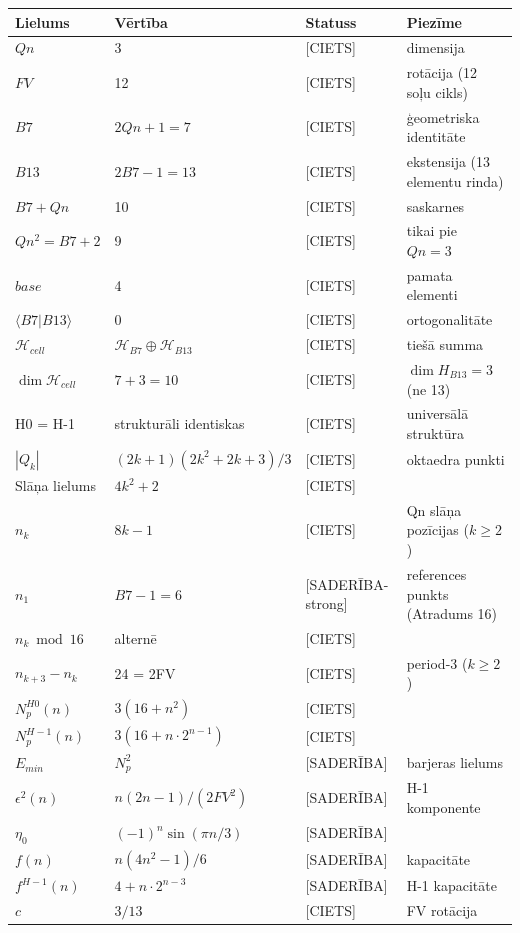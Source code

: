 \documentclass[12pt,a4paper]{article}
\begin{document}
\begin{longtable}{|l|l|l|l|}
\hline
\textbf{Lielums} & \textbf{Vērtība} & \textbf{Statuss} & \textbf{Piezīme} \\
\hline
\endhead
$Qn$ & 3 & [CIETS] & dimensija \\
$FV$ & 12 & [CIETS] & rotācija (12 soļu cikls) \\
$B7$ & $2Qn+1 = 7$ & [CIETS] & ģeometriska identitāte \\
$B13$ & $2B7-1 = 13$ & [CIETS] & ekstensija (13 elementu rinda) \\
$B7+Qn$ & 10 & [CIETS] & saskarnes \\
$Qn^2 = B7+2$ & 9 & [CIETS] & tikai pie $Qn=3$ \\
$base$ & 4 & [CIETS] & pamata elementi \\
$\langle B7|B13\rangle$ & 0 & [CIETS] & ortogonalitāte \\
$\mathcal{H}_{cell}$ & $\mathcal{H}_{B7}\oplus\mathcal{H}_{B13}$ & [CIETS] & tiešā summa \\
$\dim\mathcal{H}_{cell}$ & $7+3=10$ & [CIETS] & $\dim H_{B13}=3$ (ne 13) \\
H0 = H-1 & strukturāli identiskas & [CIETS] & universālā struktūra \\
\hline
$|Q_k|$ & $(2k+1)(2k^2+2k+3)/3$ & [CIETS] & oktaedra punkti \\
Slāņa lielums & $4k^2+2$ & [CIETS] & \\
$n_k$ & $8k-1$ & [CIETS] & Qn slāņa pozīcijas ($k\geq 2$) \\
$n_1$ & $B7-1 = 6$ & [SADERĪBA-strong] & references punkts (Atradums 16) \\
$n_k \bmod 16$ & alternē & [CIETS] & \\
$n_{k+3}-n_k$ & 24 = 2FV & [CIETS] & period-3 ($k\geq 2$) \\
$N_p^{H0}(n)$ & $3(16+n^2)$ & [CIETS] & \\
$N_p^{H-1}(n)$ & $3(16+n\cdot 2^{n-1})$ & [CIETS] & \\
$E_{min}$ & $N_p^2$ & [SADERĪBA] & barjeras lielums \\
$\epsilon^2(n)$ & $n(2n-1)/(2FV^2)$ & [SADERĪBA] & H-1 komponente \\
$\eta_0$ & $(-1)^n\sin(\pi n/3)$ & [SADERĪBA] & \\
$f(n)$ & $n(4n^2-1)/6$ & [SADERĪBA] & kapacitāte \\
$f^{H-1}(n)$ & $4+n\cdot 2^{n-3}$ & [SADERĪBA] & H-1 kapacitāte \\
\hline
$c$ & $3/13$ & [CIETS] & FV rotācija \\

\end{longtable}
\end{document}
